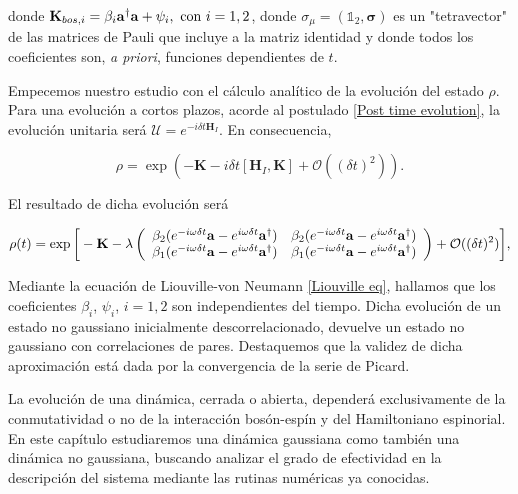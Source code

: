 \documentclass{report} %
\numberwithin{equation}{section}
\begin{document}
donde $\mathbf{K}_{bos,i}= \beta_{i}{\bf a}^{\dagger}{\bf a} + \psi_i,  \textnormal{ con } i =1,2$, donde $\sigma_{\mu}=(\mathds{1}_2, \boldsymbol{\sigma})$ es un "tetravector"  de las matrices de Pauli que incluye a la matriz identidad y donde todos los coeficientes son, \textit{a priori}, funciones dependientes de $t$. 

Empecemos nuestro estudio con el cálculo analítico de la evolución del estado $\rho$. Para una evolución a cortos plazos, acorde al postulado \ref{Post time evolution}, la evolución unitaria será $\mathcal{U} = e^{-i\delta t \mathbf{H}_I}$. En consecuencia, 

\begin{equation}
    \rho = \exp (-\mathbf{K} - i\delta t [\mathbf{H}_I,\mathbf{K}] + \mathcal{O}((\delta t)^2) ).
\end{equation}

El resultado de dicha evolución será

\begin{equation}
    \rho(t) = \exp \bigg[ -\mathbf{K} -\lambda \left(\begin{array}{cc}
        \beta_2 (e^{-i\omega \delta t}{\bf a}-e^{i\omega \delta t}{\bf a}^{\dagger}) & \beta_2 (e^{-i\omega \delta t}{\bf a}-e^{i\omega \delta t}{\bf a}^{\dagger})  \\
        \beta_1 (e^{-i\omega \delta t}{\bf a}-e^{i\omega \delta t}{\bf a}^{\dagger}) & \beta_1 (e^{-i\omega \delta t}{\bf a}-e^{i\omega \delta t}{\bf a}^{\dagger}) 
    \end{array}\right) + \mathcal{O}((\delta t)^2)
    \bigg],
    \label{model3.4_rho1_ev}
\end{equation}

Mediante la ecuación de Liouville-von Neumann \eqref{Liouville eq}, hallamos que los coeficientes $\beta_i$, $\psi_i$, $i=1,2$ son independientes del tiempo. Dicha evolución de un estado no gaussiano inicialmente descorrelacionado, devuelve un estado no gaussiano con correlaciones de pares. Destaquemos que la validez de dicha aproximación está dada por la convergencia de la serie de Picard.

La evolución de una dinámica, cerrada o abierta, dependerá exclusivamente de la conmutatividad o no de la interacción bosón-espín y del Hamiltoniano espinorial. En este capítulo estudiaremos una dinámica gaussiana como también una dinámica no gaussiana, buscando analizar el grado de efectividad en la descripción del sistema mediante las rutinas numéricas ya conocidas. 
\end{document}
